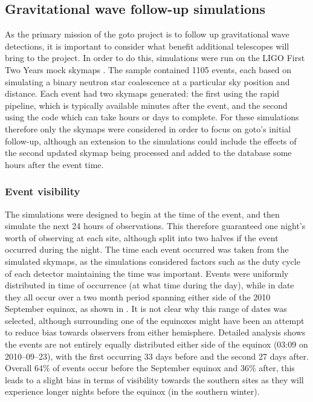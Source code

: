 \begin{colsection}
\begin{colsection}
\end{colsection}


\subsection{Gravitational wave follow-up simulations}
\label{sec:gw_sims}
\begin{colsection}

As the primary mission of the \gls{goto} project is to follow up gravitational wave detections, it is important to consider what benefit additional telescopes will bring to the project. In order to do this, simulations were run on the LIGO First Two Years mock skymaps \citep{First2Years}. The sample contained 1105 events, each based on simulating a binary neutron star coalescence at a particular sky position and distance. Each event had two skymaps generated: the first using the rapid  pipeline, which is typically available minutes after the event, and the second using the  code which can take hours or days to complete. For these simulations therefore only the  skymaps were considered in order to focus on \gls{goto}'s initial follow-up, although an extension to the simulations could include the effects of the second updated skymap being processed and added to the database some hours after the event time.

\subsubsection{Event visibility}

The simulations were designed to begin at the time of the event, and then simulate the next 24 hours of observations. This therefore guaranteed one night's worth of observing at each site, although split into two halves if the event occurred during the night. The time each event occurred was taken from the simulated skymaps, as the \citet{First2Years} simulations considered factors such as the duty cycle of each detector maintaining the time was important. Events were uniformly distributed in time of occurrence (at what time during the day), while in date they all occur over a two month period spanning either side of the 2010 September equinox, as shown in . It is not clear why this range of dates was selected, although surrounding one of the equinoxes might have been an attempt to reduce bias towards observers from either hemisphere. Detailed analysis shows the events are not entirely equally distributed either side of the equinox (03:09 on 2010--09--23), with the first occurring 33 days before and the second 27 days after. Overall 64\% of events occur before the September equinox and 36\% after, this leads to a slight bias in terms of visibility towards the southern sites as they will experience longer nights before the equinox (in the southern winter).


\end{colsection}
\end{colsection}
